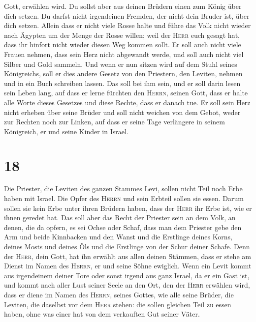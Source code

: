 Gott, erwählen wird. Du sollst aber aus deinen Brüdern einen zum König
über dich setzen. Du darfst nicht irgendeinen Fremden, der nicht dein
Bruder ist, über dich setzen.  Allein dass er nicht viele
Rosse halte und führe das Volk nicht wieder nach Ägypten um der Menge
der Rosse willen; weil der \textsc{Herr} euch gesagt hat, dass ihr
hinfort nicht wieder diesen Weg kommen sollt.  Er soll
auch nicht viele Frauen nehmen, dass sein Herz nicht abgewandt werde,
und soll auch nicht viel Silber und Gold sammeln.  Und
wenn er nun sitzen wird auf dem Stuhl seines Königreichs, soll er dies
andere Gesetz von den Priestern, den Leviten, nehmen und in ein Buch
schreiben lassen.  Das soll bei ihm sein, und er soll
darin lesen sein Leben lang, auf dass er lerne fürchten den
\textsc{Herrn}, seinen Gott, dass er halte alle Worte dieses Gesetzes
und diese Rechte, dass er danach tue.  Er soll sein Herz
nicht erheben über seine Brüder und soll nicht weichen von dem Gebot,
weder zur Rechten noch zur Linken, auf dass er seine Tage verlängere in
seinem Königreich, er und seine Kinder in Israel.

\hypertarget{section-17}{%
\section{18}\label{section-17}}

 Die Priester, die Leviten des ganzen Stammes Levi, sollen
nicht Teil noch Erbe haben mit Israel. Die Opfer des \textsc{Herrn} und
sein Erbteil sollen sie essen.  Darum sollen sie kein Erbe
unter ihren Brüdern haben, dass der \textsc{Herr} ihr Erbe ist, wie er
ihnen geredet hat.  Das soll aber das Recht der Priester
sein an dem Volk, an denen, die da opfern, es sei Ochse oder Schaf, dass
man dem Priester gebe den Arm und beide Kinnbacken und den Wanst
 und die Erstlinge deines Korns, deines Mosts und deines
Öls und die Erstlinge von der Schur deiner Schafe.  Denn
der \textsc{Herr}, dein Gott, hat ihn erwählt aus allen deinen Stämmen,
dass er stehe am Dienst im Namen des \textsc{Herrn}, er und seine Söhne
ewiglich.  Wenn ein Levit kommt aus irgendeinem deiner
Tore oder sonst irgend aus ganz Israel, da er ein Gast ist, und kommt
nach aller Lust seiner Seele an den Ort, den der \textsc{Herr} erwählen
wird,  dass er diene im Namen des \textsc{Herrn}, seines
Gottes, wie alle seine Brüder, die Leviten, die daselbst vor dem
\textsc{Herr} stehen:  die sollen gleichen Teil zu essen
haben, ohne was einer hat von dem verkauften Gut seiner Väter.

